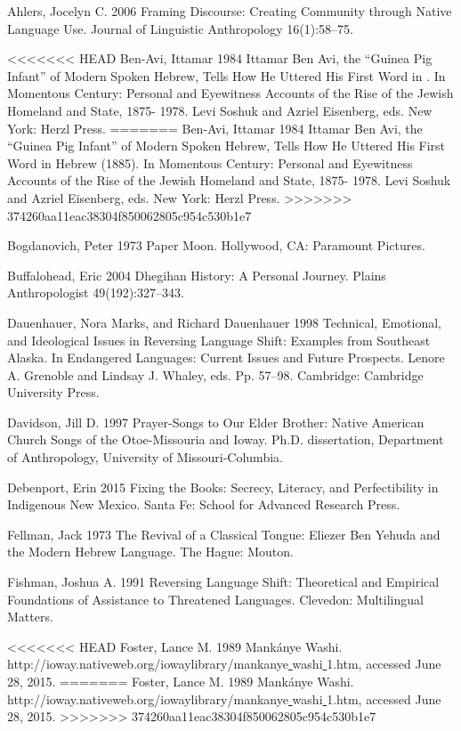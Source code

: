 \documentclass[output=paper]{LSP/langsci}
\begin{document}
\begin{reflist}

Ahlers, Jocelyn C. 2006 Framing Discourse: Creating Community through Native Language Use. Journal of Linguistic Anthropology 16(1):58--75.

<<<<<<< HEAD
Ben-Avi, Ittamar 1984 Ittamar Ben Avi, the ``Guinea Pig Infant'' of Modern Spoken Hebrew, Tells How He Uttered His First Word in \citet{Hebrew1885}. In Momentous Century: 	Personal and Eyewitness Accounts of the Rise of the Jewish Homeland and State, 1875-	1978. Levi Soshuk and Azriel Eisenberg, eds. New York: Herzl Press.
=======
Ben-Avi, Ittamar 1984 Ittamar Ben Avi, the ``Guinea Pig Infant'' of Modern Spoken Hebrew, Tells How He Uttered His First Word in Hebrew (1885). In Momentous Century: 	Personal and Eyewitness Accounts of the Rise of the Jewish Homeland and State, 1875-	1978. Levi Soshuk and Azriel Eisenberg, eds. New York: Herzl Press.
>>>>>>> 374260aa11eac38304f850062805c954c530b1e7

Bogdanovich, Peter 1973 Paper Moon. Hollywood, CA: Paramount Pictures.

Buffalohead, Eric 2004 Dhegihan History: A Personal Journey. Plains Anthropologist 49(192):327--343.

Dauenhauer, Nora Marks, and Richard Dauenhauer 1998 Technical, Emotional, and Ideological Issues in Reversing Language Shift: Examples from Southeast Alaska. In Endangered Languages: Current Issues and Future Prospects. Lenore A. Grenoble and Lindsay J. Whaley, eds. Pp. 57--98. Cambridge: Cambridge University Press.

Davidson, Jill D. 1997 Prayer-Songs to Our Elder Brother: Native American Church Songs of the Otoe-Missouria and Ioway. Ph.D. dissertation, Department of Anthropology, University of Missouri-Columbia.

Debenport, Erin 2015 Fixing the Books: Secrecy, Literacy, and Perfectibility in Indigenous New Mexico. Santa Fe: School for Advanced Research Press.

Fellman, Jack 1973 The Revival of a Classical Tongue: Eliezer Ben Yehuda and the Modern Hebrew Language. The Hague: Mouton.

Fishman, Joshua A. 1991 Reversing Language Shift: Theoretical and Empirical Foundations of Assistance to Threatened Languages. Clevedon: Multilingual Matters.

<<<<<<< HEAD
Foster, Lance M. 1989 Mankánye Washi. http://ioway.nativeweb.org/iowaylibrary/mankanye\underline{ }washi\underline{ }1.htm, accessed June 28, 2015.
=======
Foster, Lance M. 1989 Mank\'anye Washi. http://ioway.nativeweb.org/iowaylibrary/mankanye\underline{ }washi\underline{ }1.htm, accessed June 28, 2015.
>>>>>>> 374260aa11eac38304f850062805c954c530b1e7


\end{reflist}
\end{document}
